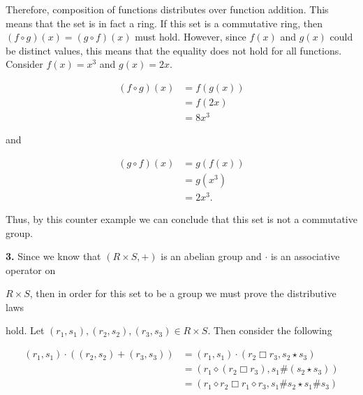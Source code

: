 \documentclass[12pt, a4paper]{article}
\begin{document}
\begin{addmargin}[2.8em]{2.8em}
    \noindent Therefore, composition of functions distributes over function addition. This means that the set is in fact a ring. If this set is a commutative ring, then $(f\circ g)(x)=(g\circ f)(x)$ must hold. However, since $f(x)$ and $g(x)$ could be distinct values, this means that the equality does not hold for all functions. Consider $f(x)=x^3$ and $g(x)=2x$.
    
    \begin{equation*}
        \begin{split}
            (f\circ g)(x) & = f(g(x)) \\
            & = f(2x) \\
            & = 8x^3
        \end{split}
    \end{equation*}
    
    \noindent and
    
    \begin{equation*}
        \begin{split}
            (g\circ f)(x) & = g(f(x)) \\ 
            & = g(x^3) \\
            & = 2x^3.
        \end{split}
    \end{equation*}
    
    \noindent Thus, by this counter example we can conclude that this set is not a commutative group.

\end{addmargin}

\vspace{4mm}

\noindent\textbf{3.} Since we know that $(R\times S, +)$ is an abelian group and $\cdot$ is an associative operator on\par $R\times S$, then in order for this set to be a group we must prove the distributive laws\par hold. Let $(r_1,s_1),(r_2,s_2),(r_3,s_3)\in R\times S$. Then consider the following\par

\begin{equation*}
    \begin{split}
        (r_1,s_1)\cdot((r_2,s_2)+(r_3,s_3)) & = (r_1,s_1)\cdot(r_2\Box r_3, s_2\star s_3) \\
        & = (r_1\diamond(r_2\Box r_3), s_1\#(s_2\star s_3)) \\
        & = (r_1\diamond r_2\Box r_1\diamond r_3, s_1\#s_2\star s_1\# s_3)
    \end{split}
\end{equation*}
\end{document}
